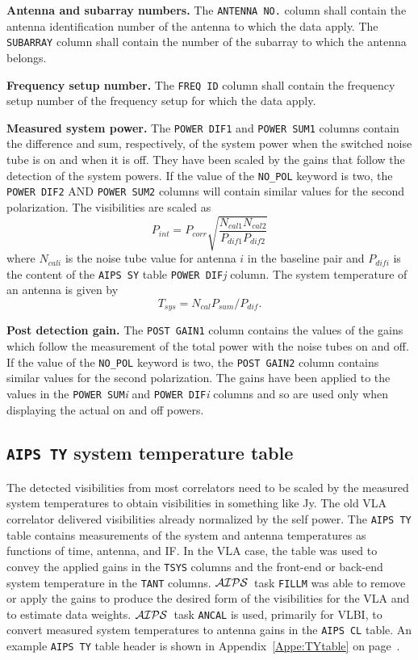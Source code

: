 \documentclass[twoside]{article}
\newcommand{\AIPS}{{$\cal AIPS\/$}}
\begin{document}
{\bf Antenna and subarray numbers.}  The {\tt ANTENNA NO.} column
shall contain the antenna identification number of the antenna to
which the data apply.  The {\tt SUBARRAY} column shall contain the
number of the subarray to which the antenna belongs.

{\bf Frequency setup number.}  The {\tt FREQ ID} column shall contain
the frequency setup number of the frequency setup for which the data
apply.

{\bf Measured system power.} The {\tt POWER DIF1} and {\tt POWER SUM1}
columns contain the difference and sum, respectively, of the system
power when the switched noise tube is on and when it is off.  They
have been scaled by the gains that follow the detection of the system
powers.  If the value of the {\tt NO\_POL} keyword is two, the {\tt
POWER DIF2} AND {\tt POWER SUM2} columns will contain similar values
for the second polarization. The visibilities are scaled as
\begin{equation}
      P_{int} = P_{corr}
      \sqrt{\frac{N_{cal1}N_{cal2}}{P_{dif1}P_{dif2}}}
\end{equation}
where $N_{cali}$ is the noise tube value for antenna $i$ in the
baseline pair and $P_{difi}$ is the content of the {\tt AIPS SY} table
{\tt POWER DIF}{\it j} column.  The system temperature of an antenna
is given by
\begin{equation}
      T_{sys} =  N_{cal} P_{sum} / P_{dif}.
\end{equation}

{\bf Post detection gain.} The {\tt POST GAIN1} column contains the
values of the gains which follow the measurement of the total power
with the noise tubes on and off.  If the value of the {\tt NO\_POL}
keyword is two, the {\tt POST GAIN2} column contains similar values
for the second polarization.  The gains have been applied to the
values in the {\tt POWER SUM}{\it i} and {\tt POWER DIF}{\it i}
columns and so are used only when displaying the actual on and off
powers.

\subsection{{\tt AIPS TY} system temperature table}
\label{s:TY}

The detected visibilities from most correlators need to be scaled by
the measured system temperatures to obtain visibilities in something
like Jy.  The old VLA correlator delivered visibilities already
normalized by the self power.  The {\tt AIPS TY} table contains
measurements of the system and antenna temperatures as functions of
time, antenna, and IF\@.  In the VLA case, the table was used to
convey the applied gains in the {\tt TSYS} columns and the front-end
or back-end system temperature in the {\tt TANT} columns.  \AIPS\ task
{\tt FILLM} was able to remove or apply the gains to produce the
desired form of the visibilities for the VLA and to estimate data
weights.  \AIPS\ task {\tt ANCAL} is used, primarily for VLBI, to
convert measured system temperatures to antenna gains in the {\tt AIPS
  CL} table.  An example {\tt AIPS TY} table header is shown in
Appendix~\ref{Appe:TYtable} on page~\pageref{Appe:TYtable}.
\end{document}
